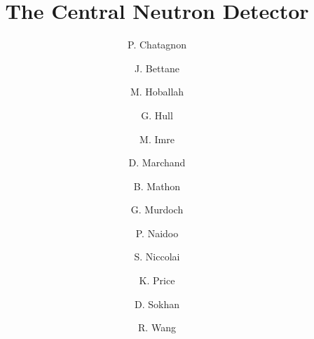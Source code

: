 \title{The Central Neutron Detector}

\author[A]{P. Chatagnon}
\author[A]{J. Bettane}
\author[A]{M. Hoballah}
\author[A]{G. Hull}
\author[A]{M. Imre}
\author[A]{D. Marchand}
\author[A]{B. Mathon}
\author[B]{G. Murdoch}
\author[B]{P. Naidoo}
\author[A]{S. Niccolai}
\author[A]{K. Price}
\author[B]{D. Sokhan}
\author[A]{R. Wang}

\address[A]{Institut de Physique Nucl\'eaire, CNRS-IN2P3, Univ. Paris-Sud, Universit\'e Paris-Saclay, 91406 Orsay Cedex, France}
\address[B]{University of Glasgow, Glasgow G12 8QQ, United Kingdom}

